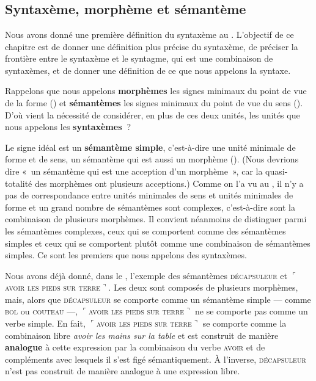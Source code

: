 \chapter{}\label{sec:3.1}

\section{Syntaxème, morphème et sémantème}\label{sec:3.1.0}

Nous avons donné une première définition du syntaxème au . L’objectif de ce chapitre est de donner une définition plus précise du syntaxème, de préciser la frontière entre le syntaxème et le syntagme, qui est une combinaison de syntaxèmes, et de donner une définition de ce que nous appelons la syntaxe.

Rappelons que nous appelons \textbf{morphèmes} les signes minimaux du point de vue de la forme () et \textbf{sémantèmes} les signes minimaux du point de vue du sens (). D’où vient la nécessité de considérer, en plus de ces deux unités, les unités que nous appelons les \textbf{syntaxèmes~}?

Le signe idéal est un \textbf{sémantème simple}, c’est-à-dire une unité minimale de forme et de sens, un sémantème qui est aussi un morphème (). (Nous devrions dire «~un sémantème qui est une acception d’un morphème~», car la quasi-totalité des morphèmes ont plusieurs acceptions.) Comme on l’a vu au , il n’y a pas de correspondance entre unités minimales de sens et unités minimales de forme et un grand nombre de sémantèmes sont complexes, c’est-à-dire sont la combinaison de plusieurs morphèmes. Il convient néanmoins de distinguer parmi les sémantèmes complexes, ceux qui se comportent comme des sémantèmes simples et ceux qui se comportent plutôt comme une combinaison de sémantèmes simples. Ce sont les premiers que nous appelons des syntaxèmes.

Nous avons déjà donné, dans le , l’exemple des sémantèmes \textsc{décapsuleur} et $⌜$\textsc{avoir} \textsc{les} \textsc{pieds} \textsc{sur} \textsc{terre}$⌝$. Les deux sont composés de plusieurs morphèmes, mais, alors que \textsc{décapsuleur} se comporte comme un sémantème simple — comme \textsc{bol} ou \textsc{couteau} —, $⌜$\textsc{avoir} \textsc{les} \textsc{pieds} \textsc{sur} \textsc{terre}$⌝$ ne se comporte pas comme un verbe simple. En fait, $⌜$\textsc{avoir} \textsc{les} \textsc{pieds} \textsc{sur} \textsc{terre}$⌝$ se comporte comme la combinaison libre \textit{avoir les mains sur la table} et est construit de manière \textbf{analogue} à cette expression par la combinaison du verbe \textsc{avoir} et de compléments avec lesquels il s’est figé sémantiquement. À l’inverse, \textsc{décapsuleur} n’est pas construit de manière analogue à une expression libre.

